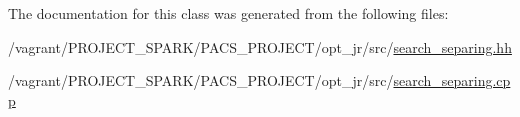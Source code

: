 The documentation for this class was generated from the following files\-:\begin{DoxyCompactItemize}
\item 
/vagrant/\-P\-R\-O\-J\-E\-C\-T\-\_\-\-S\-P\-A\-R\-K/\-P\-A\-C\-S\-\_\-\-P\-R\-O\-J\-E\-C\-T/opt\-\_\-jr/src/\hyperlink{search__separing_8hh}{search\-\_\-separing.\-hh}\item 
/vagrant/\-P\-R\-O\-J\-E\-C\-T\-\_\-\-S\-P\-A\-R\-K/\-P\-A\-C\-S\-\_\-\-P\-R\-O\-J\-E\-C\-T/opt\-\_\-jr/src/\hyperlink{search__separing_8cpp}{search\-\_\-separing.\-cpp}\end{DoxyCompactItemize}
